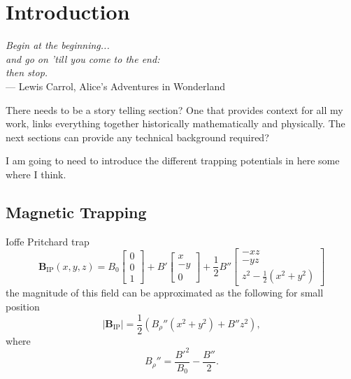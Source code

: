 
\chapter{Introduction} %

\label{ch:intro} %


\begin{flushright}{\slshape    
Begin at the beginning...\\
and go on 'till you come to the end:\\
then stop.} \\ \medskip
--- Lewis Carrol, Alice's Adventures in Wonderland
\end{flushright}

\bigskip


There needs to be a story telling section?
One that provides context for all my work, links everything together historically mathematically and physically.
The next sections can provide any technical background required?


I am going to need to introduce the different trapping potentials in here some where I think.

\section{Magnetic Trapping} \label{sec:intromag}

Ioffe Pritchard trap \cite{Meystre2001}
\begin{equation}
    \mathbf{B}_{\mathrm{IP}}(x,y,z) = B_0 \begin{bmatrix} 0\\ 0\\ 1 \end{bmatrix}
                      + B' \begin{bmatrix} x\\-y\\ 0 \end{bmatrix}
                      + \frac{1}{2}B'' \begin{bmatrix}-xz\\-yz\\ z^2-\frac{1}{2}\left(x^2+y^2\right) \end{bmatrix}
\end{equation}
the magnitude of this field can be approximated as the following for small position
\begin{equation}
    \left| \mathbf{B}_{\mathrm{IP}} \right| = \frac{1}{2}\left(B_{\rho}''\left(x^2+y^2\right) + B''z^2\right), \label{eq:ipmag}
\end{equation}
where 
\begin{equation*}
    B_\rho''= \frac{B'^2}{B_0} - \frac{B''}{2}. 
\end{equation*}


